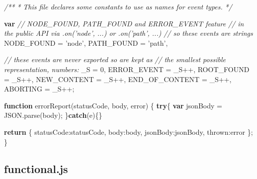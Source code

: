 \documentclass[]{article}
\newenvironment{Shaded}{}{}
\newcommand{\KeywordTok}[1]{\textcolor[rgb]{0.00,0.44,0.13}{\textbf{{#1}}}}
\newcommand{\DataTypeTok}[1]{\textcolor[rgb]{0.56,0.13,0.00}{{#1}}}
\newcommand{\DecValTok}[1]{\textcolor[rgb]{0.25,0.63,0.44}{{#1}}}
\newcommand{\StringTok}[1]{\textcolor[rgb]{0.25,0.44,0.63}{{#1}}}
\newcommand{\CommentTok}[1]{\textcolor[rgb]{0.38,0.63,0.69}{\textit{{#1}}}}
\newcommand{\OtherTok}[1]{\textcolor[rgb]{0.00,0.44,0.13}{{#1}}}
\newcommand{\FunctionTok}[1]{\textcolor[rgb]{0.02,0.16,0.49}{{#1}}}
\newcommand{\NormalTok}[1]{{#1}}
\begin{document}
\begin{Shaded}
\begin{Highlighting}[]
\CommentTok{/**}
\CommentTok{ * This file declares some constants to use as names for event types.}
\CommentTok{ */}

\KeywordTok{var} \CommentTok{// NODE_FOUND, PATH_FOUND and ERROR_EVENT feature }
    \CommentTok{// in the public API via .on('node', ...) or .on('path', ...)}
    \CommentTok{// so these events are strings}
    \NormalTok{NODE_FOUND    = }\StringTok{'node'}\NormalTok{,  }
    \NormalTok{PATH_FOUND    = }\StringTok{'path'}\NormalTok{,   }
         
    \CommentTok{// these events are never exported so are kept as }
    \CommentTok{// the smallest possible representation, numbers:}
    \NormalTok{_S = }\DecValTok{0}\NormalTok{,}
    \NormalTok{ERROR_EVENT   = _S++,    }
    \NormalTok{ROOT_FOUND    = _S++,    }
    \NormalTok{NEW_CONTENT = _S++,}
    \NormalTok{END_OF_CONTENT = _S++,}
    \NormalTok{ABORTING = _S++;}
    
\KeywordTok{function} \FunctionTok{errorReport}\NormalTok{(statusCode, body, error) \{}
   \KeywordTok{try}\NormalTok{\{}
      \KeywordTok{var} \NormalTok{jsonBody = }\OtherTok{JSON}\NormalTok{.}\FunctionTok{parse}\NormalTok{(body);}
   \NormalTok{\}}\KeywordTok{catch}\NormalTok{(e)\{\}}

   \KeywordTok{return} \NormalTok{\{}
      \DataTypeTok{statusCode}\NormalTok{:statusCode,}
      \DataTypeTok{body}\NormalTok{:body,}
      \DataTypeTok{jsonBody}\NormalTok{:jsonBody,}
      \DataTypeTok{thrown}\NormalTok{:error}
   \NormalTok{\};}
\NormalTok{\}    }
\end{Highlighting}
\end{Shaded}

\pagebreak

\subsection{functional.js}

\label{src_functional}
\end{document}
